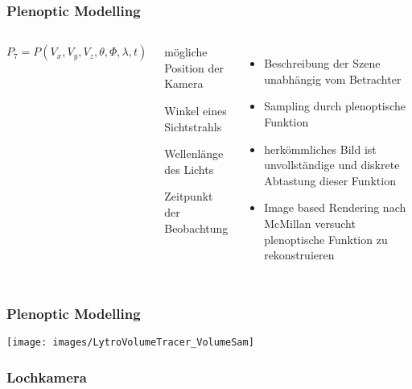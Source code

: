 \documentclass[aspectratio=169]{beamer}
\begin{document}
\begin{frame}
    \frametitle{Plenoptic Modelling}

    \begin{columns}
        \begin{equation}
            P_7 = P(V_x, V_y, V_z, \theta, \Phi, \lambda, t)
        \end{equation}
        
        \vspace{.5cm}

        \begin{description}[style=sameline]
            \item[\( V_x, V_y, V_z \)] mögliche Position der Kamera
            \item[\( \theta, \Phi \)] Winkel eines Sichtstrahls
            \item[\( \lambda \)] Wellenlänge des Lichts
            \item[\( t \)] Zeitpunkt der Beobachtung
        \end{description}
        \begin{itemize}
            \item Beschreibung der Szene unabhängig vom Betrachter
            \item Sampling durch plenoptische Funktion
            \item herkömmliches Bild ist unvollständige und diskrete Abtastung dieser Funktion
            \item Image based Rendering nach McMillan versucht plenoptische Funktion zu rekonstruieren
        \end{itemize}
    \end{columns}
\end{frame}

\begin{frame}
    \frametitle{Plenoptic Modelling}
    \centering
    \texttt{[image: images/LytroVolumeTracer\_VolumeSam]}
\end{frame}

\begin{frame}
    \frametitle{Lochkamera}
    \begin{figure}
        \centering
        \resizebox{.8\linewidth}{!}{}%
        \label{fig:pinholecamera}
    \end{figure}
\end{frame}
\end{document}
